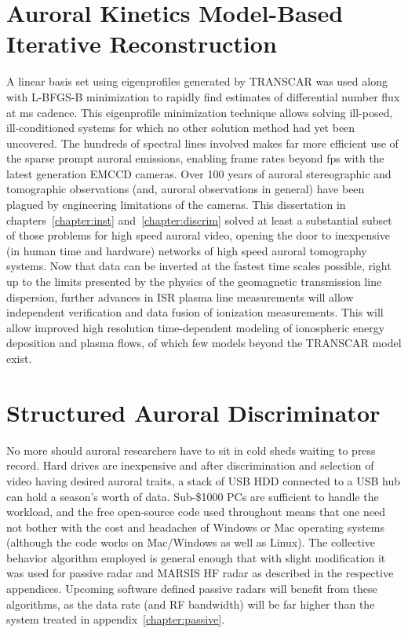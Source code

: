 \section{Auroral Kinetics Model-Based Iterative Reconstruction}
A linear basis set using eigenprofiles generated by TRANSCAR was used along with L-BFGS-B minimization to rapidly find estimates of differential number flux at \unit[20]{ms} cadence. 
This eigenprofile minimization technique allows solving ill-posed, ill-conditioned systems for which no other solution method had yet been uncovered.
The hundreds of spectral lines involved makes far more efficient use of the sparse prompt auroral emissions, enabling frame rates beyond \unit[50]{fps} with the latest generation EMCCD cameras.
Over 100 years of auroral stereographic and tomographic observations (and, auroral observations in general) have been plagued by engineering limitations of the cameras.
This dissertation in chapters~\ref{chapter:inst} and~\ref{chapter:discrim} solved at least a substantial subset of those problems for high speed auroral video, opening the door to inexpensive (in human time and hardware) networks of high speed auroral tomography systems.
Now that data can be inverted at the fastest time scales possible, right up to the limits presented by the physics of the geomagnetic transmission line dispersion, further advances in ISR plasma line measurements will allow independent verification and data fusion of ionization measurements.
This will allow improved high resolution time-dependent modeling of ionospheric energy deposition and plasma flows, of which few models beyond the TRANSCAR model exist.

\section{Structured Auroral Discriminator}
No more should auroral researchers have to sit in cold sheds waiting to press record.
Hard drives are inexpensive and after discrimination and selection of video having desired auroral traits, a stack of USB HDD connected to a USB hub can hold a season's worth of data.
Sub-\$1000 PCs are sufficient to handle the workload, and the free open-source code used throughout means that one need not bother with the cost and headaches of Windows or Mac operating systems (although the code works on Mac/Windows as well as Linux).
The collective behavior algorithm employed is general enough that with slight modification it was used for passive radar and MARSIS HF radar as described in the respective appendices.
Upcoming software defined passive radars will benefit from these algorithms, as the data rate (and RF bandwidth) will be far higher than the system treated in appendix~\ref{chapter:passive}.


